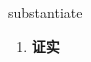
\begin{frame}
{\huge substantiate}
\begin{center}
\begin{enumerate}\Large
  \item \textbf{证实}
\end{enumerate}
\end{center}
\end{frame}
